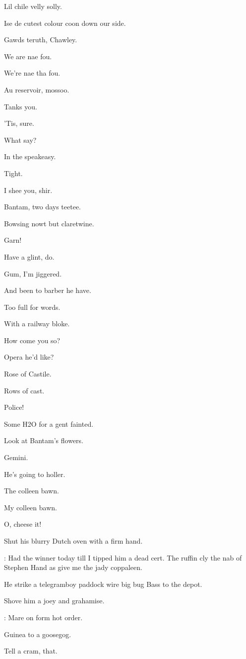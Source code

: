 Lil chile velly solly.

Ise de cutest colour coon down our side.

Gawds teruth,
Chawley.

We are nae fou.

We're nae tha fou.

Au reservoir,
mossoo.

Tanks you.


'Tis,
sure.

What say?

In the speakeasy.

Tight.

I shee you,
shir.

Bantam,
two days teetee.

Bowsing nowt but claretwine.

Garn!

Have a glint,
do.

Gum,
I'm jiggered.

And been to barber he have.

Too full for words.

With a railway bloke.

How come you so?

Opera he'd like?

Rose of Castile.

Rows of cast.

Police!

Some H2O for a gent fainted.

Look at Bantam's flowers.

Gemini.

He's going to holler.

The colleen bawn.

My colleen bawn.

O,
cheese it!

Shut his blurry Dutch oven with a firm hand.

\lenehan:
Had the winner today till I tipped him a dead cert.
The ruffin cly the nab of Stephen Hand as give me the jady coppaleen.

He strike a telegramboy paddock wire big bug Bass to the depot.

Shove him a joey and grahamise.

\lenehan:
Mare on form hot order.

Guinea to a goosegog.

Tell a cram,
that.

